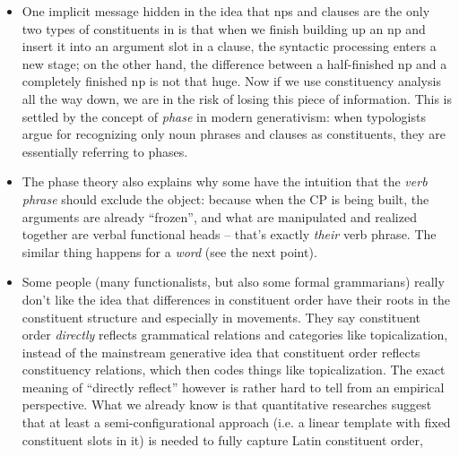 \documentclass[a4paper, oneside, 12pt]{report}
\newcommand*{\term}[1]{\emph{#1}}
\begin{document}
{\begin{itemize}
        The counterpart of c-command relations in the dependency analysis 
        is how ``tight'' a dependency relation is:
        that the relation between the verb and the object is tighter 
        than the relation between the verb and the subject 
        is equivalent to that the subject has a higher position in the syntactic tree.
    \item One implicit message hidden in the idea that 
        \acs{np}s and clauses are the only two types of constituents 
        in \citet{dixon2009basic1}  
        is that when we finish building up an \acs{np} 
        and insert it into an argument slot in a clause, 
        the syntactic processing enters a new stage;
        on the other hand, the difference between a half-finished \acs{np}
        and a completely finished \acs{np}
        is not that huge.
        Now if we use constituency analysis all the way down, 
        we are in the risk of losing this piece of information.
        This is settled by the concept of \emph{phase} in modern generativism:
        when typologists argue for recognizing only noun phrases and clauses as constituents, 
        they are essentially referring to phases. 
    \item The phase theory also explains why some have the intuition that 
        the \term{verb phrase} should exclude the object: 
        because when the CP is being built, 
        the arguments are already ``frozen'', 
        and what are manipulated and realized together 
        are verbal functional heads -- that's exactly \emph{their} verb phrase. 
        The similar thing happens for a \term{word} (see the next point). 
    \item Some people (many functionalists, but also some formal grammarians) 
        really don't like the idea that 
        differences in constituent order have their roots in 
        the constituent structure and especially in movements. 
        They say constituent order \emph{directly} reflects 
        grammatical relations and categories like topicalization, 
        instead of the mainstream generative idea that 
        constituent order reflects constituency relations,
        which then codes things like topicalization. 
        The exact meaning of ``directly reflect'' however is rather hard to tell 
        from an empirical perspective.
        What we already know is that
        quantitative researches suggest that 
        at least a semi-configurational approach 
        (i.e. a linear template with fixed constituent slots in it)
        is needed to fully capture Latin constituent order, 

\end{itemize}}
\end{document}
